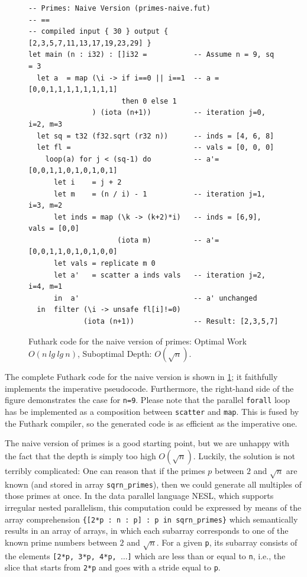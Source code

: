 \documentclass[acmsmall,review]{acmart}\settopmatter{printfolios=true,printccs=false,printacmref=false}
\begin{document}
\begin{figure}
\begin{lstlisting}[mathescape=true]
-- Primes: Naive Version (primes-naive.fut)
-- ==
-- compiled input { 30 } output { [2,3,5,7,11,13,17,19,23,29] }
let main (n : i32) : []i32 =           -- Assume n = 9, sq = 3 
  let a  = map (\i -> if i==0 || i==1  -- a = [0,0,1,1,1,1,1,1,1,1]
                      then 0 else 1
               ) (iota (n+1))          -- iteration j=0, i=2, m=3
  let sq = t32 (f32.sqrt (r32 n))      -- inds = [4, 6, 8]
  let fl =                             -- vals = [0, 0, 0]
    loop(a) for j < (sq-1) do          -- a'= [0,0,1,1,0,1,0,1,0,1]
      let i    = j + 2
      let m    = (n / i) - 1           -- iteration j=1, i=3, m=2
      let inds = map (\k -> (k+2)*i)   -- inds = [6,9], vals = [0,0]
                     (iota m)          -- a'= [0,0,1,1,0,1,0,1,0,0]
      let vals = replicate m 0         
      let a'   = scatter a inds vals   -- iteration j=2, i=4, m=1
      in  a'                           -- a' unchanged
  in  filter (\i -> unsafe fl[i]!=0)   
             (iota (n+1))              -- Result: [2,3,5,7]
\end{lstlisting}\vspace{-4ex}
\caption{Futhark code for the naive version of primes:
            Optimal Work $O(n \ lg \ lg \ n)$, Suboptimal Depth: $O(\sqrt{n})$.}
\label{fig:primes-naive-Futhark}
\end{figure}

\medskip

The complete Futhark code for the naive version is shown in 
\cref{fig:primes-naive-Futhark}; it faithfully implements the
imperative pseudocode. Furthermore, the right-hand side of
the figure demonstrates the case for {\tt n=9}. Please note 
that the parallel \lstinline{forall} loop has be implemented
as a composition between \lstinline{scatter} and \lstinline{map}.
This is fused by the Futhark compiler, so the generated code
is as efficient as the imperative one. 

\bigskip

The naive version of primes is a good starting point, but we
are unhappy with the fact that the depth is simply too high 
$O(\sqrt{n})$.
%
Luckily, the solution is not terribly complicated: One can
reason that if the primes $p$ between $2$ and $\sqrt{n}$ are 
known (and stored in array {\tt sqrn\_primes}), then we could 
generate all multiples of those primes at once.
In the data parallel language NESL, which supports irregular
nested parallelism, this computation could be expressed by 
means of the array comprehension
{\tt \{[2*p : n : p] : p in sqrn\_primes\}} which semantically
results in an array of arrays, in which each subarray
corresponds to one of the known prime numbers between
$2$ and $\sqrt{n}$. For a given {\tt p}, its subarray
consists of the elements {\tt [2*p, 3*p, 4*p, $\ldots$]}
which are less than or equal to {\tt n}, i.e., the slice that
starts from {\tt 2*p} and goes with a stride equal to 
{\tt p}.
\end{document}
